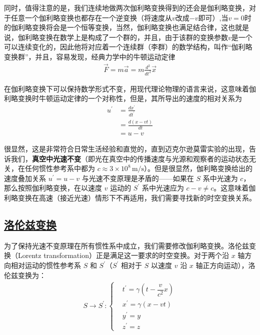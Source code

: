 同时，值得注意的是，我们连续地做两次伽利略变换得到的还会是伽利略变换，对于任意一个伽利略变换也都存在一个逆变换（将速度从$v$改成$-v$即可）,当$v=0$时的伽利略变换将会是一个恒等变换，当然，伽利略变换也满足结合律，这也就是说，伽利略变换在数学上是构成了一个群的，并且，由于该群的变换参数$v$是一个可以连续变化的，因此他将对应着一个连续群（李群）的数学结构，叫作“伽利略变换群”，并且，容易发现，经典力学中的牛顿运动定律
\begin{align*}
    \vec{F}=m\vec{a}=m\frac{d^2}{dt^2}\vec{x}
\end{align*}

在伽利略变换下可以保持数学形式不变，用现代理论物理的语言来说，这意味着伽利略变换时牛顿运动定律的一个对称性，但是，其所导出的速度的相对关系为
\begin{align*}
    u^\prime&=\frac{d x^\prime}{dt^\prime}\\
    &=\frac{d(x-vt)}{dt}\\
    &=u-v
\end{align*}

很显然，这是非常符合日常生活经验和直觉的，直到迈克尔逊莫雷实验的出现，告诉我们，\textbf{真空中光速不变}（即光在真空中的传播速度与光源和观察者的运动状态无关，在任何惯性参考系中都为 $c \approx 3\times 10^8\,\text{m/s}$）。但是很显然，伽利略变换给出的速度叠加关系 $u^\prime = u - v$ 与光速不变原理是矛盾的——如果在 $S$ 系中光速为 $c$，那么按照伽利略变换，在以速度 $v$ 运动的 $S^\prime$ 系中光速应为 $c - v \neq c$。这意味着伽利略变换在高速（接近光速）情形下不再适用，我们需要寻找新的时空变换关系。

\subsection{\protect\hyperlink{:}{洛伦兹变换}}

为了保持光速不变原理在所有惯性系中成立，我们需要修改伽利略变换。洛伦兹变换（Lorentz transformation）正是满足这一要求的时空变换。对于两个沿 $x$ 轴方向相对运动的惯性参考系 $S$ 和 $S^\prime$（$S^\prime$ 相对于 $S$ 以速度 $v$ 沿 $x$ 轴正方向运动），洛伦兹变换为：
\begin{align*}
    S\to S^\prime:
    \begin{cases}
        &t^\prime = \gamma\left(t - \dfrac{v}{c^2}x\right)\\[6pt]
        &x^\prime = \gamma(x - vt)\\
        &y^\prime = y\\
        &z^\prime = z
    \end{cases}
\end{align*}

